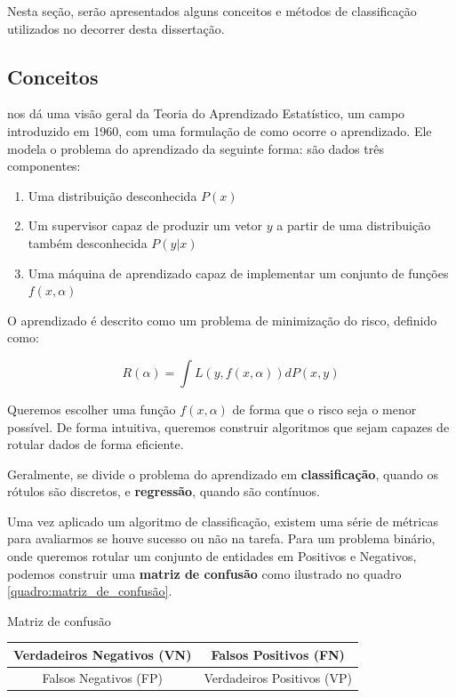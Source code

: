 Nesta seção, serão apresentados alguns conceitos e métodos de classificação utilizados no decorrer desta dissertação.

\subsection{Conceitos}
\label{section:metodologia:classificadores:conceitos}

 nos dá uma visão geral da Teoria do Aprendizado Estatístico, um campo introduzido em 1960, com uma formulação de como ocorre o aprendizado. Ele modela o problema do aprendizado da seguinte forma: são dados três componentes:

\begin{enumerate}
    \item Uma distribuição desconhecida $P(x)$
    \item Um supervisor capaz de produzir um vetor $y$ a partir de uma distribuição também desconhecida $P(y|x)$
    \item Uma máquina de aprendizado capaz de implementar um conjunto de funções $f(x,\alpha)$
\end{enumerate}

O aprendizado é descrito como um problema de minimização do risco, definido como:

\begin{equation}
    R(\alpha) = \int L(y,f(x,\alpha)) dP(x,y)
\end{equation}

Queremos escolher uma função $f(x,\alpha)$ de forma que o risco seja o menor possível. De forma intuitiva, queremos construir algoritmos que sejam capazes de rotular dados de forma eficiente. 

Geralmente, se divide o problema do aprendizado em \textbf{classificação}, quando os rótulos são discretos, e \textbf{regressão}, quando são contínuos.

Uma vez aplicado um algoritmo de classificação, existem uma série de métricas para avaliarmos se houve sucesso ou não na tarefa. Para um problema binário, onde queremos rotular um conjunto de entidades em Positivos e Negativos, podemos construir uma \textbf{matriz de confusão} como ilustrado no quadro \ref{quadro:matriz_de_confusão}.

\begin{quadro}[htb]
\caption{Matriz de confusão}
\label{quadro:matriz_de_confusão}
\centering
\begin{tabular}{c|c}
Verdadeiros Negativos (VN) & Falsos Positivos (FN) \\ \hline
Falsos Negativos (FP) & Verdadeiros Positivos (VP) \\
\end{tabular}
\end{quadro}

